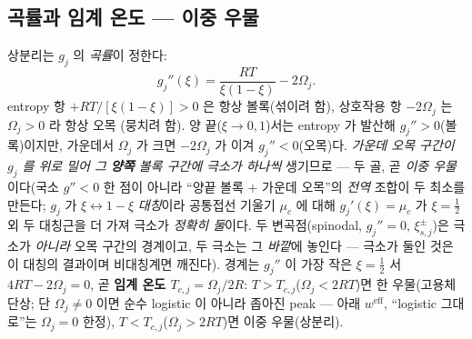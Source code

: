 \documentclass[11pt,a4paper]{article}
\newcommand{\eff}{\mathrm{eff}}
\begin{document}
\subsection{곡률과 임계 온도 — 이중 우물}
상분리는 $g_j$ 의 \emph{곡률}이 정한다:
\begin{equation}
g_j''(\xi)=\frac{RT}{\xi(1-\xi)}-2\Omega_j.
\label{eq:regsol_gpp}
\end{equation}
entropy 항 $+RT/[\xi(1-\xi)]>0$ 은 항상 볼록(섞이려 함), 상호작용 항 $-2\Omega_j$ 는 $\Omega_j>0$ 라 항상 오목
(뭉치려 함). 양 끝($\xi\to0,1$)서는 entropy 가 발산해 $g_j''>0$(볼록)이지만, 가운데서 $\Omega_j$ 가 크면 $-2\Omega_j$ 가
이겨 $g_j''<0$(오목)다. \emph{가운데 오목 구간이 $g_j$ 를 위로 밀어 그 \textbf{양쪽} 볼록 구간에 극소가 하나씩} 생기므로
— 두 골, 곧 \emph{이중 우물}이다(국소 $g''<0$ 한 점이 아니라 ``양끝 볼록 $+$ 가운데 오목''의 \emph{전역} 조합이 두 최소를
만든다; $g_j$ 가 $\xi\!\leftrightarrow\!1-\xi$ \emph{대칭}이라 공통접선 기울기 $\mu_c$ 에 대해 $g_j'(\xi)=\mu_c$ 가 $\xi=\tfrac12$
외 두 대칭근을 더 가져 극소가 \emph{정확히 둘}이다. 두 변곡점(spinodal, $g_j''=0$, $\xi_{s,j}^\pm$)은 극소가 \emph{아니라}
오목 구간의 경계이고, 두 극소는 그 \emph{바깥}에 놓인다 — 극소가 둘인 것은 이 대칭의 결과이며 비대칭계면 깨진다). 경계는 $g_j''$ 이 가장 작은 $\xi=\tfrac12$ 서 $4RT-2\Omega_j=0$, 곧
\textbf{임계 온도 $T_{c,j}=\Omega_j/2R$}: $T>T_{c,j}$($\Omega_j<2RT$)면 한 우물(고용체 단상; 단 $\Omega_j\ne0$ 이면 순수
logistic 이 아니라 좁아진 peak — 아래 $w^\eff$, ``logistic 그대로''는 $\Omega_j=0$ 한정),
$T<T_{c,j}$($\Omega_j>2RT$)면 이중 우물(상분리).
\end{document}
